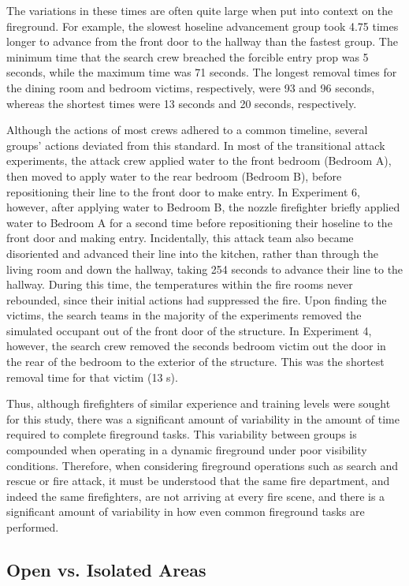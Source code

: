 \documentclass[12pt,oneside]{article}
\begin{document}
The variations in these times are often quite large when put into context on the fireground. For example, the slowest hoseline advancement group took 4.75 times longer to advance from the front door to the hallway than the fastest group. The minimum time that the search crew breached the forcible entry prop was 5 seconds, while the maximum time was 71 seconds. The longest removal times for the dining room and bedroom victims, respectively, were 93 and 96 seconds, whereas the shortest times were 13 seconds and 20 seconds, respectively. 

Although the actions of most crews adhered to a common timeline, several groups' actions deviated from this standard. In most of the transitional attack experiments, the attack crew applied water to the front bedroom (Bedroom A), then moved to apply water to the rear bedroom (Bedroom B), before repositioning their line to the front door to make entry. In Experiment 6, however, after applying water to Bedroom B, the nozzle firefighter briefly applied water to Bedroom A for a second time before repositioning their hoseline to the front door and making entry. Incidentally, this attack team also became disoriented and advanced their line into the kitchen, rather than through the living room and down the hallway, taking 254 seconds to advance their line to the hallway. During this time, the temperatures within the fire rooms never rebounded, since their initial actions had suppressed the fire. Upon finding the victims, the search teams in the majority of the experiments removed the simulated occupant out of the front door of the structure. In Experiment 4, however, the search crew removed the seconds bedroom victim out the door in the rear of the bedroom to the exterior of the structure. This was the shortest removal time for that victim (13 s). 

Thus, although firefighters of similar experience and training levels were sought for this study, there was a significant amount of variability in the amount of time required to complete fireground tasks. This variability between groups is compounded when operating in a dynamic fireground under poor visibility conditions. Therefore, when considering fireground operations such as search and rescue or fire attack, it must be understood that the same fire department, and indeed the same firefighters, are not arriving at every fire scene, and there is a significant amount of variability in how even common fireground tasks are performed. 

\subsection{Open vs. Isolated Areas}
\label{subsec:open_v_iso}
\end{document}
